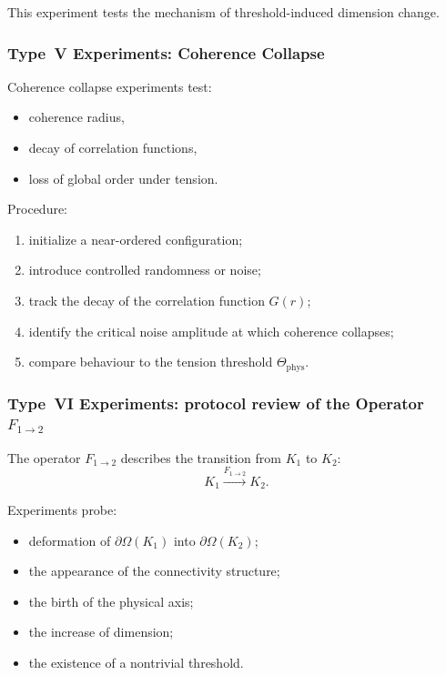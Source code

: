 This experiment tests the mechanism of threshold-induced dimension change.



\subsubsection{Type~V Experiments: Coherence Collapse}

Coherence collapse experiments test:

\begin{itemize}
    \item coherence radius,
    \item decay of correlation functions,
    \item loss of global order under tension.
\end{itemize}

Procedure:

\begin{enumerate}
    \item initialize a near-ordered configuration;
    \item introduce controlled randomness or noise;
    \item track the decay of the correlation function $G(r)$;
    \item identify the critical noise amplitude at which coherence
          collapses;
    \item compare behaviour to the tension threshold $\Theta_{\mathrm{phys}}$.
\end{enumerate}



\subsubsection{Type~VI Experiments: protocol review of the Operator $F_{1\rightarrow 2}$}

The operator $F_{1\rightarrow 2}$ describes the transition from $K_1$ to $K_2$:
\[
   K_1 \xrightarrow{F_{1\rightarrow 2}} K_2.
\]

Experiments probe:

\begin{itemize}
    \item deformation of $\partial\Omega(K_1)$ into
          $\partial\Omega(K_2)$;
    \item the appearance of the connectivity structure;
    \item the birth of the physical axis;
    \item the increase of dimension;
    \item the existence of a nontrivial threshold.
\end{itemize}

